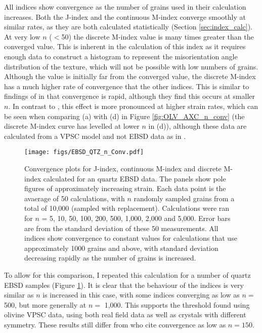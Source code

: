 \documentclass[a4paper,12pt,twoside]{report}
\numberwithin{equation}{chapter}
\begin{document}
All indices show convergence as the number of grains used in their calculation increases. Both the J-index and the continuous M-index converge smoothly at similar rates, as they are both calculated statistically (Section \ref{sec:index_calc}). At very low $n$ ($<$50) the discrete M-index value is many times greater than the converged value. This is inherent in the calculation of this index as it requires enough data to construct a histogram to represent the misorientation angle distribution of the texture, which will not be possible with low numbers of grains. Although the value is initially far from the converged value, the discrete M-index has a much higher rate of convergence that the other indices. This is similar to findings of \cite{Skemer} in that convergence is rapid, although they find this occurs at smaller $n$. In contrast to \cite{Skemer}, this effect is more pronounced at higher strain rates, which can be seen when comparing (a) with (d) in Figure \ref{fig:OLV_AXC_n_conv} (the discrete M-index curve has levelled at lower $n$ in (d)), although these data are calculated from a VPSC model and not EBSD data as in \cite{Skemer}.

\begin{figure}[t!]
  \centering
    \texttt{[image: figs/EBSD\_QTZ\_n\_Conv.pdf]}
  \caption[Convergence with no. of grains (quartz EBSD)]{Convergence plots for J-index, continuous M-index and discrete M-index calculated for an quartz EBSD data. The panels show pole figures of approximately increasing strain. Each data point is the avaerage of 50 calculations, with $n$ randomly sampled grains from a total of 10,000 (sampled with replacement). Calculations were ran for $n$ = 5, 10, 50, 100, 200, 500, 1,000, 2,000 and 5,000. Error bars are from the standard deviation of these 50 measurements. All indices show convergence to constant values for calculations that use approximately 1000 grains and above, with standard deviation decreasing rapidly as the number of grains is increased.}
  \label{fig:EBSD_QTZ_n_conv}
\end{figure}

To allow for this comparison, I repeated this calculation for a number of quartz EBSD samples (Figure \ref{fig:EBSD_QTZ_n_conv}). It is clear that the behaviour of the indices is very similar as $n$ is increased in this case, with some indices converging as low as $n =$ 500, but more generally at $n =$ 1,000. This supports the threshold found using olivine VPSC data, using both real field data as well as crystals with different symmetry. These results still differ from \cite{Skemer} who cite convergence as low as $n = 150$. 
\end{document}

